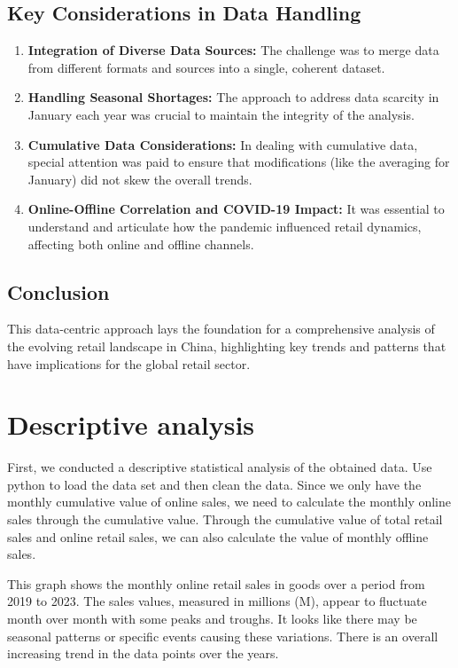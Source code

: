 \documentclass{article}
\begin{document}
\subsection*{Key Considerations in Data Handling}

\begin{enumerate}
    \item \textbf{Integration of Diverse Data Sources:} The challenge was to merge data from different formats and sources into a single, coherent dataset.
    \item \textbf{Handling Seasonal Shortages:} The approach to address data scarcity in January each year was crucial to maintain the integrity of the analysis.
    \item \textbf{Cumulative Data Considerations:} In dealing with cumulative data, special attention was paid to ensure that modifications (like the averaging for January) did not skew the overall trends.
    \item \textbf{Online-Offline Correlation and COVID-19 Impact:} It was essential to understand and articulate how the pandemic influenced retail dynamics, affecting both online and offline channels.
\end{enumerate}

\subsection*{Conclusion}

This data-centric approach lays the foundation for a comprehensive analysis of the evolving retail landscape in China, highlighting key trends and patterns that have implications for the global retail sector.


\section{Descriptive analysis}
First, we conducted a descriptive statistical analysis of the obtained data. Use python to load the data set and then clean the data. Since we only have the monthly cumulative value of online sales, we need to calculate the monthly online sales through the cumulative value. Through the cumulative value of total retail sales and online retail sales, we can also calculate the value of monthly offline sales.

This graph shows the monthly online retail sales in goods over a period from 2019 to 2023.
The sales values, measured in millions (M), appear to fluctuate month over month with some peaks and troughs. It looks like there may be seasonal patterns or specific events causing these variations.
There is an overall increasing trend in the data points over the years.
\end{document}

